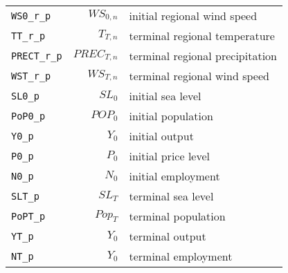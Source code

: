 \begin{center}
\begin{longtable}{lrl}
\texttt{WS0\_r\_p} & ${WS_{0,n}}$ & initial regional wind speed\\
\texttt{TT\_r\_p} & ${T_{T,n}}$ & terminal regional temperature\\
\texttt{PRECT\_r\_p} & ${PREC_{T,n}}$ & terminal regional precipitation\\
\texttt{WST\_r\_p} & ${WS_{T,n}}$ & terminal regional wind speed\\
\texttt{SL0\_p} & ${SL_0}$ & initial sea level\\
\texttt{PoP0\_p} & ${POP_0}$ & initial population\\
\texttt{Y0\_p} & ${Y_0}$ & initial output\\
\texttt{P0\_p} & ${P_0}$ & initial price level\\
\texttt{N0\_p} & ${N_0}$ & initial employment\\
\texttt{SLT\_p} & ${SL_T}$ & terminal sea level\\
\texttt{PoPT\_p} & ${Pop_T}$ & terminal population\\
\texttt{YT\_p} & ${Y_0}$ & terminal output\\
\texttt{NT\_p} & ${Y_0}$ & terminal employment\\
\hline%
\end{longtable}
\end{center}
